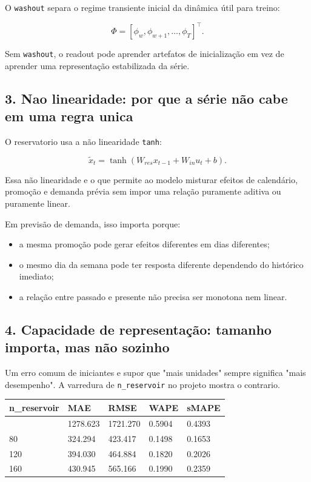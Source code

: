 \documentclass[12pt]{article}
\providecommand{\tightlist}{%
          \setlength{\itemsep}{0pt}\setlength{\parskip}{0pt}}
\begin{document}
O \texttt{washout} separa o regime transiente inicial da dinâmica útil para treino:

\[
\Phi = [\phi_w, \phi_{w+1}, \dots, \phi_T]^\top.
\]

Sem \texttt{washout}, o readout pode aprender artefatos de inicialização em vez de aprender uma representação estabilizada da série.

\subsection{3. Nao linearidade: por que a série não cabe em uma regra unica}\label{3-nao-linearidade-por-que-a-suxe9rie-nuxe3o-cabe-em-uma-regra-unica}

O reservatorio usa a não linearidade \texttt{tanh}:

\[
\widetilde{x}_t = \tanh(W_{res} x_{t-1} + W_{in} u_t + b).
\]

Essa não linearidade e o que permite ao modelo misturar efeitos de calendário, promoção e demanda prévia sem impor uma relação puramente aditiva ou puramente linear.

Em previsão de demanda, isso importa porque:

\begin{itemize}
\tightlist
\item
  a mesma promoção pode gerar efeitos diferentes em dias diferentes;
\item
  o mesmo dia da semana pode ter resposta diferente dependendo do histórico imediato;
\item
  a relação entre passado e presente não precisa ser monotona nem linear.
\end{itemize}

\subsection{4. Capacidade de representação: tamanho importa, mas não sozinho}\label{4-capacidade-de-representauxe7uxe3o-tamanho-importa-mas-nuxe3o-sozinho}

Um erro comum de iniciantes e supor que "mais unidades" sempre significa "mais desempenho". A varredura de \texttt{n\_reservoir} no projeto mostra o contrario.

\begin{longtable}[]{@{}lllll@{}}
\toprule\noalign{}
n\_reservoir & MAE & RMSE & WAPE & sMAPE \\
\midrule\noalign{}
\endhead
\bottomrule\noalign{}
\endlastfoot
40 & 1278.623 & 1721.270 & 0.5904 & 0.4393 \\
80 & 324.294 & 423.417 & 0.1498 & 0.1653 \\
120 & 394.030 & 464.884 & 0.1820 & 0.2026 \\
160 & 430.945 & 565.166 & 0.1990 & 0.2359 \\
\end{longtable}
\end{document}
